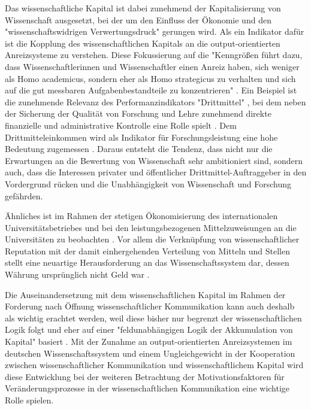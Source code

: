 Das wissenschaftliche Kapital ist dabei zunehmend der Kapitalisierung von Wissenschaft ausgesetzt, bei der um den Einfluss der Ökonomie und den "wissenschaftswidrigen Verwertungsdruck" \cite[:12]{Neidhardt_2006} gerungen wird. Als ein Indikator dafür ist die Kopplung des wissenschaftlichen Kapitals an die output-orientierten Anreizsysteme zu verstehen. Diese Fokussierung auf die "Kenngrößen führt dazu, dass Wissenschaftlerinnen und Wissenschaftler einen Anreiz haben, sich weniger als Homo academicus, sondern eher als Homo strategicus zu verhalten und sich auf die gut messbaren Aufgabenbestandteile zu konzentrieren" \cite{Frost_2014}. Ein Beispiel ist die zunehmende Relevanz des Performanzindikators "Drittmittel" \cite{Fabrizio_2008} \cite{Jansen_2007}, bei dem neben der Sicherung der Qualität von Forschung und Lehre zunehmend direkte finanzielle und administrative Kontrolle eine Rolle spielt \cite{Barl_sius_2008}. Dem Drittmitteleinkommen wird als Indikator für Forschungsleistung eine hohe Bedeutung zugemessen \cite{Jansen_2007}. Daraus entsteht die Tendenz, dass nicht nur die Erwartungen an die Bewertung von Wissenschaft sehr ambitioniert sind, sondern auch, dass die Interessen privater und öffentlicher Drittmittel-Auftraggeber in den Vordergrund rücken und die Unabhängigkeit von Wissenschaft und Forschung gefährden.

Ähnliches ist im Rahmen der stetigen Ökonomisierung des internationalen Universitätsbetriebes \cite{brembs2015open} und bei den leistungsbezogenen Mittelzuweisungen an die Universitäten zu beobachten \cite[:12]{Neidhardt_2006}. Vor allem die Verknüpfung von wissenschaftlicher Reputation mit der damit einhergehenden Verteilung von Mitteln und Stellen stellt eine neuartige Herausforderung an das Wissenschaftssystem dar, dessen Währung ursprünglich nicht Geld war \cite{hanekop_2006} \cite[:15]{buss2001wissen}.

Die Auseinandersetzung mit dem wissenschaftlichen Kapital im Rahmen der Forderung nach Öffnung wissenschaftlicher Kommunikation kann auch deshalb als wichtig erachtet werden, weil diese bisher nur begrenzt der wissenschaftlichen Logik folgt und eher auf einer "feldunabhängigen Logik der Akkumulation von Kapital" basiert \cite{herb_2006}. Mit der Zunahme an output-orientierten Anreizsystemen im deutschen Wissenschaftssystem \cite{osterloh2008anreize} und einem Ungleichgewicht in der Kooperation zwischen wissenschaftlicher Kommunikation und wissenschaftlichem Kapital wird diese Entwicklung bei der weiteren Betrachtung der Motivationsfaktoren für Veränderungsprozesse in der wissenschaftlichen Kommunikation eine wichtige Rolle spielen.

